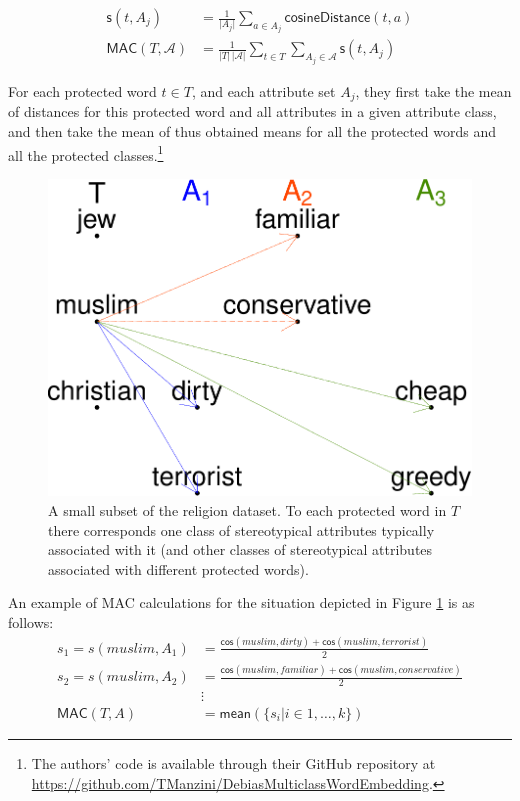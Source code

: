 \documentclass{clv3}
\begin{document}
\begin{align*}
\mathsf{s}(t, A_j) & = \frac{1}{\vert A_j\vert}\sum_{a\in A_j}\mathsf{cosineDistance}(t,a) \\
\mathsf{MAC}(T,\mathcal{A}) & = \frac{1}{\vert T \vert \,\vert \mathcal{A}\vert}\sum_{t \in T }\sum_{A_j \in \mathcal{A}}    \mathsf{s}(t,A_j)
\end{align*}

\noindent For each protected word \(t\in T\), and each
attribute set \(A_j\), they first take the mean of distances for this
protected word and all attributes in a given attribute class, and then
take the mean of thus obtained means for all the protected words and all
the protected classes.\footnote{The authors' code is available through
  their GitHub repository at
  \url{https://github.com/TManzini/DebiasMulticlassWordEmbedding}.}

\begin{figure}

\begin{center}\includegraphics[width=0.5\linewidth]{figures/MACexample} \end{center}
\caption{A small subset of the religion dataset.  To each protected word in $T$  there corresponds one class of stereotypical attributes typically associated with it (and other classes of stereotypical attributes associated with different protected words).}
\label{fig:MACexample}
\end{figure}

\noindent An example of \textsf{MAC} calculations for the situation
depicted in Figure \ref{fig:MACexample} is as follows: \begin{align*}
s_1   = s(muslim,A_1)  & = \frac{\mathsf{cos}(muslim,dirty)+\mathsf{cos}(muslim,terrorist)}{2} \\ 
s_2   = s(muslim,A_2)  & = \frac{\mathsf{cos}(muslim,familiar)+\mathsf{cos}(muslim,conservative)}{2}\\ & \vdots \\ 
\mathsf{MAC}(T,A)  & = \mathsf{mean}(\{s_i \vert i \in 1, \dots, k\})
\end{align*}
\end{document}
